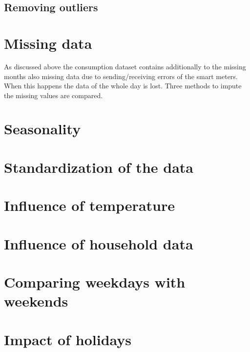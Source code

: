\subsection{Removing outliers}


\section{Missing data} \label{s:missing_data}
As discussed above the consumption dataset contains additionally to the missing months also missing data due to sending/receiving errors of the smart meters. When this happens the data of the whole day is lost. Three methods to impute the missing values are compared. 


\section{Seasonality}



\section{Standardization of the data}


\section{Influence of temperature}


\section{Influence of household data}


\section{Comparing weekdays with weekends}

\section{Impact of holidays}


